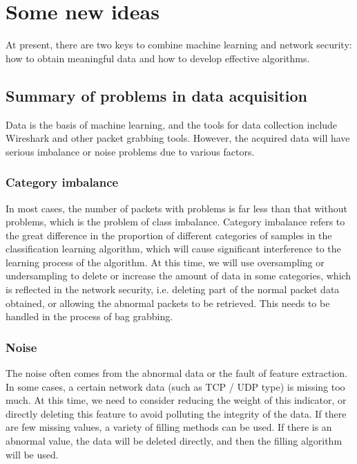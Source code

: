 \documentclass[UTF8]{article}
\begin{document}
\section{Some new ideas}

At present, there are two keys to combine machine learning and network security: how to obtain meaningful data and how to develop effective algorithms.

\subsection{Summary of problems in data acquisition}

Data is the basis of machine learning, and the tools for data collection include Wireshark and other packet grabbing tools. However, the acquired data will have serious imbalance or noise problems due to various factors.

\subsubsection{Category imbalance}

In most cases, the number of packets with problems is far less than that without problems, which is the problem of class imbalance. Category imbalance refers to the great difference in the proportion of different categories of samples in the classification learning algorithm, which will cause significant interference to the learning process of the algorithm. At this time, we will use oversampling or undersampling to delete or increase the amount of data in some categories, which is reflected in the network security, i.e. deleting part of the normal packet data obtained, or allowing the abnormal packets to be retrieved. This needs to be handled in the process of bag grabbing.


\subsubsection{Noise}

The noise often comes from the abnormal data or the fault of feature extraction. In some cases, a certain network data (such as TCP / UDP type) is missing too much. At this time, we need to consider reducing the weight of this indicator, or directly deleting this feature to avoid polluting the integrity of the data. If there are few missing values, a variety of filling methods can be used. If there is an abnormal value, the data will be deleted directly, and then the filling algorithm will be used.
\end{document}
